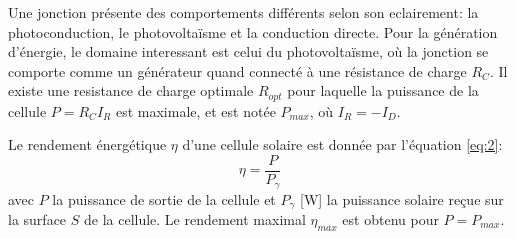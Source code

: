 Une jonction présente des comportements différents selon son eclairement: la photoconduction, le photovoltaïsme et la conduction directe.
Pour la génération d'énergie, le domaine interessant est celui du photovoltaïsme, où la jonction se comporte comme un générateur quand connecté à une résistance de charge \(R_C\).
Il existe une resistance de charge optimale \(R_{opt}\) pour laquelle la puissance de la cellule \(P = R_C I_R\) est maximale, et est notée \(P_{max}\), où \(I_R = -I_D\).

Le rendement énergétique \(\eta\) d'une cellule solaire est donnée par l'équation \ref{eq:2}:
\begin{equation}
    \eta = \frac{P}{P_\gamma}
    \label{eq:2}
\end{equation}
avec \(P\) la puissance de sortie de la cellule et \(P_\gamma\) [\unit{\watt}] la puissance solaire reçue sur la surface \(S\) de la cellule.
Le rendement maximal \(\eta_{max}\) est obtenu pour \(P = P_{max}\).
